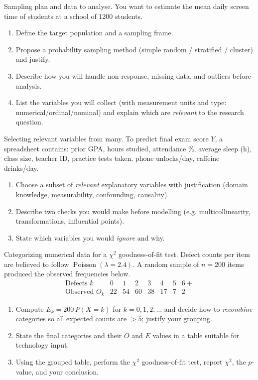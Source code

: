 \documentclass[11pt]{article}
\def\textbf#1{#1}%
\newcounter{question}
\begin{document}
\begin{question}
\textbf{Sampling plan and data to analyse.}
You want to estimate the mean daily screen time of students at a school of 1200 students.
\begin{enumerate}
  \item Define the target population and a sampling frame.
  \item Propose a probability sampling method (simple random / stratified / cluster) and justify.
  \item Describe how you will handle non-response, missing data, and outliers before analysis.
  \item List the variables you will collect (with measurement units and type: numerical/ordinal/nominal) and explain which are \emph{relevant} to the research question.
\end{enumerate}
\end{question}

\begin{question}
\textbf{Selecting relevant variables from many.}
To predict final exam score $Y$, a spreadsheet contains: prior GPA, hours studied, attendance \%, average sleep (h), class size, teacher ID, practice tests taken, phone unlocks/day, caffeine drinks/day.
\begin{enumerate}
  \item Choose a subset of \emph{relevant} explanatory variables with justification (domain knowledge, measurability, confounding, causality).
  \item Describe two checks you would make before modelling (e.g. multicollinearity, transformations, influential points).
  \item State which variables you would \emph{ignore} and why.
\end{enumerate}
\end{question}

\begin{question}
\textbf{Categorizing numerical data for a $\chi^2$ goodness-of-fit test.}
Defect counts per item are believed to follow $\operatorname{Poisson}(\lambda=2.4)$.
A random sample of $n=200$ items produced the observed frequencies below.
\[
\begin{array}{c|ccccccc}
\text{Defects }k & 0 & 1 & 2 & 3 & 4 & 5 & 6+\\\hline
\text{Observed }O_k & 22 & 54 & 60 & 38 & 17 & 7 & 2
\end{array}
\]
\begin{enumerate}
  \item Compute $E_k=200\,P(X=k)$ for $k=0,1,2,\dots$ and decide how to \emph{recombine} categories so all expected counts are $>5$; justify your grouping.
  \item State the final categories and their $O$ and $E$ values in a table suitable for technology input.
  \item Using the grouped table, perform the $\chi^2$ goodness-of-fit test, report $\chi^2$, the $p$-value, and your conclusion.
\end{enumerate}
\end{question}
\end{document}

